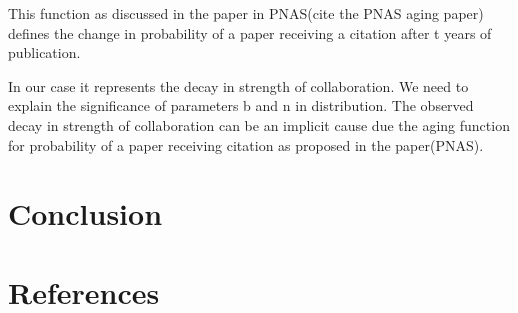 \documentclass[aps, pre, twocolumn, nofootinbib]{revtex4-1}
\begin{document}
{\color{blue}This function as discussed in the paper in PNAS(cite the PNAS aging paper) defines the change in probability of a paper receiving a citation after t years of publication.}

In our case it represents the decay in strength of collaboration. We need to explain the significance of parameters b and n in distribution. The observed decay in strength of collaboration can be an implicit cause due the aging function for probability of a paper receiving citation as proposed in the paper(PNAS). 

\section{Conclusion}

\section{References}
\end{document}
